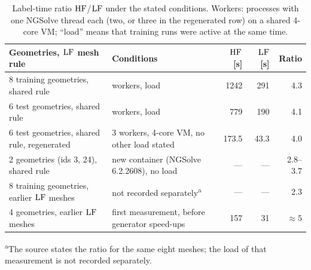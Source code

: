 \begin{table}[t]
\centering
\caption{Label-time ratio $\mathrm{HF}$/$\mathrm{LF}$ under the stated conditions. Workers: processes with one NGSolve thread each (two, or three in the regenerated row) on
a shared 4-core VM; ``load'' means that training runs were active at the same time.}
\label{tab:A06-cost}
\small
\begin{tabular}{@{}p{4.2cm}p{4.2cm}rrr@{}}
\toprule
Geometries, $\mathrm{LF}$ mesh rule & Conditions & $\mathrm{HF}$ [s] & $\mathrm{LF}$ [s] & Ratio \\
\midrule
8 training geometries, shared rule & workers, load & 1242 & 291 & 4.3 \\ %
6 test geometries, shared rule & workers, load & 779 & 190 & 4.1 \\ %
6 test geometries, shared rule, regenerated & 3 workers, 4-core VM, no other load stated & 173.5 & 43.3 & 4.0 \\ %
2 geometries (ids 3, 24), shared rule & new container (NGSolve 6.2.2608), no load & --- & --- & 2.8--3.7 \\ %
8 training geometries, earlier $\mathrm{LF}$ meshes & not recorded separately\textsuperscript{a} & --- & --- & 2.3 \\ %
4 geometries, earlier $\mathrm{LF}$ meshes & first measurement, before generator speed-ups & 157 & 31 & $\approx 5$ \\ %
\bottomrule
\end{tabular}

\smallskip
{\footnotesize\textsuperscript{a}The source states the ratio for the same eight meshes; the load of that measurement is not recorded separately.\par}
\end{table}
